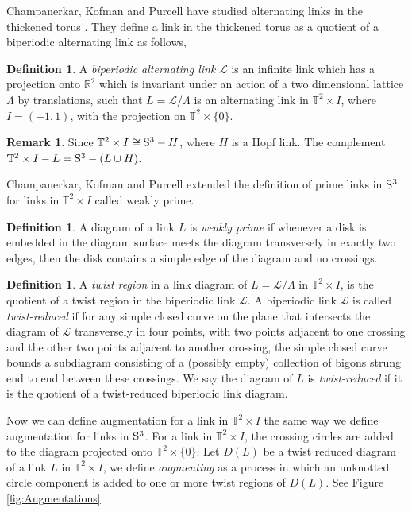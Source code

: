 \documentclass[11pt]{amsart}
\newcommand{\Sp}{{\rm{S}}}
\newcommand{\R}{\mathbb{R}}
\newcommand{\torus}{{\mathbb{T}^2}}
\theoremstyle{plain}
\theoremstyle{definition}
\newtheorem{define}[theorem]{Definition}
\newtheorem{remark}[theorem]{Remark}
\begin{document}
Champanerkar, Kofman and Purcell have studied alternating links in the thickened torus \cite{CKP2}. They define a link in the thickened torus as a quotient of a biperiodic alternating link as follows,
 
\begin{define}
\label{def:biperiodiclink}
A \emph{biperiodic alternating link} $\mathcal{L}$ is an infinite link
which has a projection onto
$\R^2$ which is invariant under an action of a two dimensional lattice $\Lambda$
by translations, such that $L=\mathcal{L}/\Lambda$ is an alternating link in
$\torus \times I$, where $I = (-1,1)$, with the projection on $\torus \times \{0\}$.   
\end{define}

\begin{remark}
Since $\torus \times I \cong \Sp^3 - H$, where $H$ is a Hopf link. The complement $\torus \times I- L = \Sp^3 - (L \cup H)$.
\end{remark}

Champanerkar, Kofman and Purcell \cite{CKP2} extended the definition of prime links in $\Sp^3$ for links in $\torus \times I$ called weakly prime. 

 \begin{define} \label{def:weaklyprime}
	 A diagram of a link $L$ is \emph{weakly prime} if whenever a disk is embedded in the diagram surface meets the diagram transversely in exactly two edges, then the disk contains a simple edge of the diagram and no crossings.
\end{define}


\begin{define}
A \emph{twist region} in a link diagram of $L=\mathcal{L}/\Lambda$ in $\torus
\times I$, is the quotient of a twist region in the biperiodic link
$\mathcal{L}$. 
A biperiodic link
$\mathcal{L}$ is called \emph{twist-reduced} if for any simple closed curve on
the plane that intersects the diagram of $\mathcal{L}$ transversely in four points, with two
points adjacent to one crossing and the other two points adjacent to another
crossing, the simple closed curve bounds a subdiagram consisting of a (possibly
empty) collection of bigons strung end to end between these crossings. We say
the diagram of $L$ is \emph{twist-reduced} if it is the quotient of a twist-reduced biperiodic
link diagram.  \end{define}

Now we can define augmentation for a link in $\torus \times I$ the same way we
define augmentation for links in $\Sp^3$. For a link in $\torus \times I$, the
crossing circles are added to the diagram projected onto $\torus \times \{0\}$.
Let $D(L)$ be a twist reduced diagram of a link $L$ in $\torus \times I$, we define
\emph{augmenting} as a process in which an unknotted circle component is added
to one or more twist regions of $D(L)$. See Figure \ref{fig:Augmentations}
\end{document}
